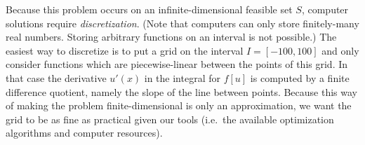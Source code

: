 \documentclass[11pt]{amsart}
\begin{document}
\begin{enumerate}
Because this problem occurs on an infinite-dimensional feasible set $S$, computer solutions require \emph{discretization}.  (Note that computers can only store finitely-many real numbers.  Storing arbitrary functions on an interval is not possible.)  The easiest way to discretize is to put a grid on the interval $I=[-100,100]$ and only consider functions which are piecewise-linear between the points of this grid.  In that case the derivative $u'(x)$ in the integral for $f[u]$ is computed by a finite difference quotient, namely the slope of the line between points.  Because this way of making the problem finite-dimensional is only an approximation, we want the grid to be as fine as practical given our tools (i.e.~the available optimization algorithms and computer resources).

\end{enumerate}
\end{document}

